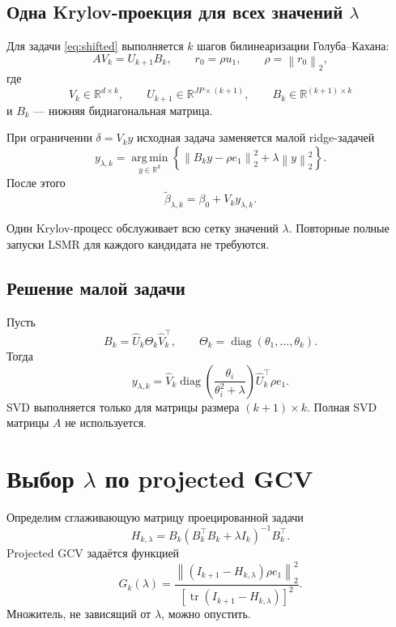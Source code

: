 \documentclass[11pt,a4paper]{article}
\newcommand{\R}{\mathbb{R}}
\newcommand{\norm}[1]{\left\lVert #1\right\rVert_2}
\newcommand{\argmin}{\operatorname*{arg\,min}}
\newcommand{\tr}{\operatorname{tr}}
\newcommand{\diag}{\operatorname{diag}}
\begin{document}
\subsection{Одна Krylov-проекция для всех значений \(\lambda\)}

Для задачи \eqref{eq:shifted} выполняется \(k\) шагов билинеаризации Голуба--Кахана:
\begin{equation}
\label{eq:gkb}
    AV_k=U_{k+1}B_k,
    \qquad
    r_0=\rho u_1,
    \qquad
    \rho=\norm{r_0},
\end{equation}
где
\[
    V_k\in\R^{d\times k},
    \qquad
    U_{k+1}\in\R^{JP\times(k+1)},
    \qquad
    B_k\in\R^{(k+1)\times k}
\]
и \(B_k\) --- нижняя бидиагональная матрица.

При ограничении \(\delta=V_ky\) исходная задача заменяется малой ridge-задачей
\begin{equation}
\label{eq:projected}
    y_{\lambda,k}
    =
    \argmin_{y\in\R^k}
    \left\{
        \norm{B_ky-\rho e_1}^{2}
        +
        \lambda\norm{y}^{2}
    \right\}.
\end{equation}
После этого
\begin{equation}
\label{eq:beta-projected}
    \widetilde\beta_{\lambda,k}
    =
    \beta_0+V_ky_{\lambda,k}.
\end{equation}

Один Krylov-процесс обслуживает всю сетку значений \(\lambda\). Повторные полные
запуски LSMR для каждого кандидата не требуются.

\subsection{Решение малой задачи}

Пусть
\[
    B_k=\widehat U_k\Theta_k\widehat V_k^\top,
    \qquad
    \Theta_k=\diag(\theta_1,\ldots,\theta_k).
\]
Тогда
\begin{equation}
\label{eq:projected-solution}
    y_{\lambda,k}
    =
    \widehat V_k
    \diag\left(
        \frac{\theta_i}{\theta_i^2+\lambda}
    \right)
    \widehat U_k^\top \rho e_1.
\end{equation}
SVD выполняется только для матрицы размера \((k+1)\times k\).
Полная SVD матрицы \(A\) не используется.

\section{Выбор \(\lambda\) по projected GCV}

Определим сглаживающую матрицу проецированной задачи
\[
    H_{k,\lambda}
    =
    B_k(B_k^\top B_k+\lambda I_k)^{-1}B_k^\top.
\]
Projected GCV задаётся функцией
\begin{equation}
\label{eq:pgcv}
    G_k(\lambda)
    =
    \frac{
        \norm{(I_{k+1}-H_{k,\lambda})\rho e_1}^{2}
    }{
        \left[
            \tr(I_{k+1}-H_{k,\lambda})
        \right]^2
    }.
\end{equation}
Множитель, не зависящий от \(\lambda\), можно опустить.
\end{document}
